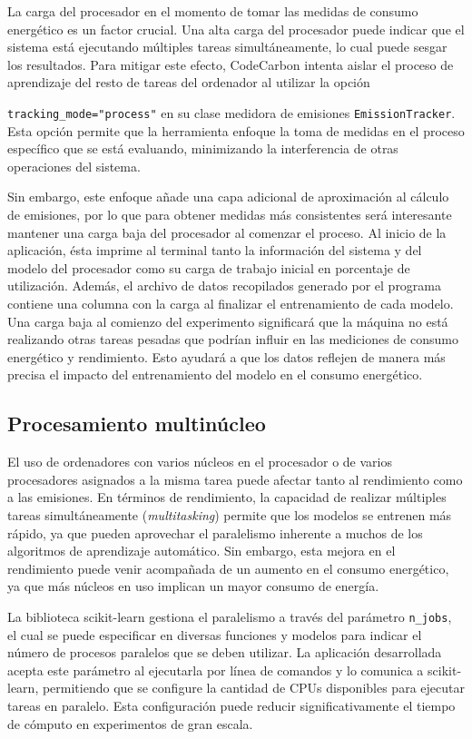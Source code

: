 La carga del procesador en el momento de tomar las medidas de consumo energético es un factor crucial. Una alta carga del procesador puede indicar que el sistema está ejecutando múltiples tareas simultáneamente, lo cual puede sesgar los resultados. Para mitigar este efecto, CodeCarbon intenta aislar el proceso de aprendizaje del resto de tareas del ordenador al utilizar la opción {\texttt{tracking\_mode="process"} en su clase medidora de emisiones \texttt{EmissionTracker}. Esta opción permite que la herramienta enfoque la toma de medidas en el proceso específico que se está evaluando, minimizando la interferencia de otras operaciones del sistema. 

Sin embargo, este enfoque añade una capa adicional de aproximación al cálculo de emisiones, por lo que para obtener medidas más consistentes será interesante mantener una carga baja del procesador al comenzar el proceso. Al inicio de la aplicación, ésta imprime al terminal tanto la información del sistema y del modelo del procesador como su carga de trabajo inicial en porcentaje de utilización. Además, el archivo de datos recopilados generado por el programa contiene una columna con la carga al finalizar el entrenamiento de cada modelo. Una carga baja al comienzo del experimento significará que la máquina no está realizando otras tareas pesadas que podrían influir en las mediciones de consumo energético y rendimiento. Esto ayudará a que los datos reflejen de manera más precisa el impacto del entrenamiento del modelo en el consumo energético.


\subsection{Procesamiento multinúcleo}

El uso de ordenadores con varios núcleos en el procesador o de varios procesadores asignados a la misma tarea puede afectar tanto al rendimiento como a las emisiones. En términos de rendimiento, la capacidad de realizar múltiples tareas simultáneamente (\emph{multitasking}) permite que los modelos se entrenen más rápido, ya que pueden aprovechar el paralelismo inherente a muchos de los algoritmos de aprendizaje automático. Sin embargo, esta mejora en el rendimiento puede venir acompañada de un aumento en el consumo energético, ya que más núcleos en uso implican un mayor consumo de energía.

La biblioteca scikit-learn gestiona el paralelismo a través del parámetro \texttt{n\_jobs}, el cual se puede especificar en diversas funciones y modelos para indicar el número de procesos paralelos que se deben utilizar. La aplicación desarrollada acepta este parámetro al ejecutarla por línea de comandos y lo comunica a scikit-learn, permitiendo que se configure la cantidad de CPUs disponibles para ejecutar tareas en paralelo. Esta configuración puede reducir significativamente el tiempo de cómputo en experimentos de gran escala.

}
